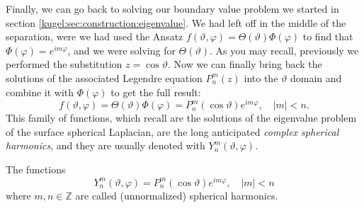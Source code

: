 Finally, we can go back to solving our boundary value problem we started in
section \ref{kugel:sec:construction:eigenvalue}. We had left off in the middle
of the separation, were we had used the Ansatz $f(\vartheta, \varphi) =
\Theta(\vartheta) \Phi(\varphi)$ to find that $\Phi(\varphi) = e^{im\varphi}$,
and we were solving for $\Theta(\vartheta)$.  As you may recall, previously we
performed the substitution $z = \cos \vartheta$. Now we can finally bring back
the solutions of the associated Legendre equation $P^m_n(z)$ into the
$\vartheta$ domain and combine it with $\Phi(\varphi)$ to get the full result:
\begin{equation*}
    f(\vartheta, \varphi)
      = \Theta(\vartheta)\Phi(\varphi)
      = P^m_n (\cos \vartheta) e^{im\varphi}, \quad |m|<n.
\end{equation*}
This family of functions, which recall are the solutions of the eigenvalue
problem of the surface spherical Laplacian, are the long anticipated
\emph{complex spherical harmonics}, and they are usually denoted with
$Y^m_n(\vartheta, \varphi)$.

\begin{definition}
  \label{kugel:def:spherical-harmonics}
  The functions
  \begin{equation*}
    Y^m_n (\vartheta, \varphi) = P^m_n(\cos \vartheta) e^{im\varphi}, \quad |m|<n
  \end{equation*}
  where $m, n \in \mathbb{Z}$ are called (unnormalized) spherical
  harmonics.
\end{definition}

